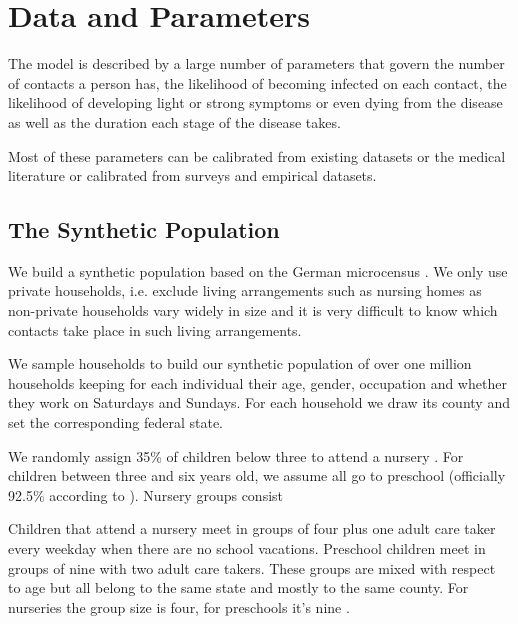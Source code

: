 \section{Data and Parameters}
\label{sec:data_and_parameters}

The model is described by a large number of parameters that govern the number of
contacts a person has, the likelihood of becoming infected on each contact, the
likelihood of developing light or strong symptoms or even dying from the disease as well
as the duration each stage of the disease takes.

Most of these parameters can be calibrated from existing datasets or the medical
literature or calibrated from surveys and empirical datasets.



\FloatBarrier

\subsection{The Synthetic Population}

We build a synthetic population based on the German microcensus \citep{FDSAeDBUDL2018}.
We only use private households, i.e. exclude living arrangements such as nursing homes as
non-private households vary widely in size and it is very difficult to know which
contacts take place in such living arrangements.

We sample households to build our synthetic population of over one million households
keeping for each individual their age, gender, occupation and whether they work on
Saturdays and Sundays. For each household we draw its county and set the corresponding
federal state.%

We randomly assign 35\% of children below three to attend a nursery \citep{Destatis2020}.
For children between three and six years old, we assume all go to preschool (officially
92.5\% according to \cite{Destatis2020}). Nursery groups consist

Children that attend a nursery meet in groups of four plus one adult care taker every
weekday when there are no school vacations. Preschool children meet in groups of nine
with two adult care takers. These groups are mixed with respect to age but all belong to
the same state and mostly to the same county. For nurseries the group size is four, for
preschools it's nine \citep{BertelsmannStiftung2019}.

